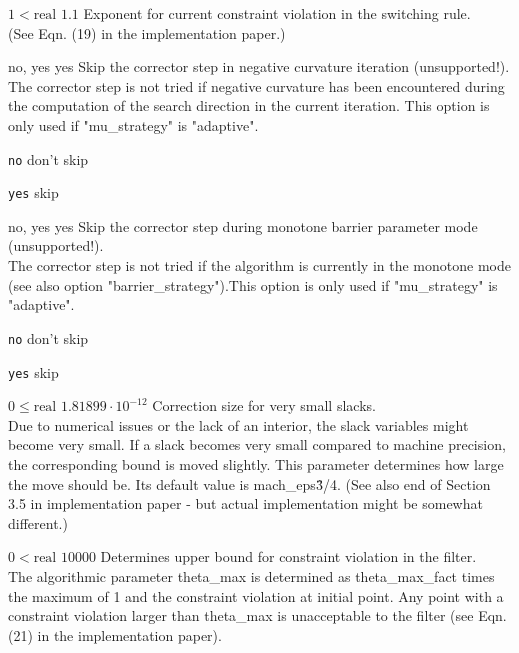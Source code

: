 %
{$1<\textrm{real}$}%
{$1.1$}%
{Exponent for current constraint violation in the switching rule.\\
(See Eqn. (19) in the implementation paper.)}%
{}

%
{no, yes}%
{yes}%
{Skip the corrector step in negative curvature iteration (unsupported!).\\
The corrector step is not tried if negative curvature has been encountered during the computation of the search direction in the current iteration. This option is only used if "mu\_strategy" is "adaptive".}%
{\begin{list}{}{
\setlength{\parsep}{0em}
\setlength{\leftmargin}{5ex}
\setlength{\labelwidth}{2ex}
\setlength{\itemindent}{0ex}
\setlength{\topsep}{0pt}}
\item[\texttt{no}] don't skip
\item[\texttt{yes}] skip
\end{list}
}

%
{no, yes}%
{yes}%
{Skip the corrector step during monotone barrier parameter mode (unsupported!).\\
The corrector step is not tried if the algorithm is currently in the monotone mode (see also option "barrier\_strategy").This option is only used if "mu\_strategy" is "adaptive".}%
{\begin{list}{}{
\setlength{\parsep}{0em}
\setlength{\leftmargin}{5ex}
\setlength{\labelwidth}{2ex}
\setlength{\itemindent}{0ex}
\setlength{\topsep}{0pt}}
\item[\texttt{no}] don't skip
\item[\texttt{yes}] skip
\end{list}
}

%
{$0\leq\textrm{real}$}%
{$1.81899 \cdot 10^{-12}$}%
{Correction size for very small slacks.\\
Due to numerical issues or the lack of an interior, the slack variables might become very small.  If a slack becomes very small compared to machine precision, the corresponding bound is moved slightly.  This parameter determines how large the move should be.  Its default value is mach\_eps\^{3/4}.  (See also end of Section 3.5 in implementation paper - but actual implementation might be somewhat different.)}%
{}

%
{$0<\textrm{real}$}%
{$10000$}%
{Determines upper bound for constraint violation in the filter.\\
The algorithmic parameter theta\_max is determined as theta\_max\_fact times the maximum of 1 and the constraint violation at initial point.  Any point with a constraint violation larger than theta\_max is unacceptable to the filter (see Eqn. (21) in the implementation paper).}%
{}

